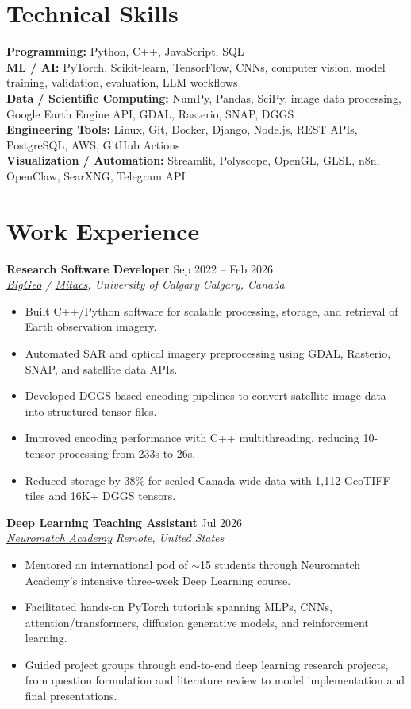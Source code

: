 \documentclass[a4paper,10pt]{article}
\newcommand{\resumeSubheading}[4]{
    \textbf{#1} \hfill #2 \\
    \textit{#3} \hfill \textit{#4}
}
\begin{document}
\section*{Technical Skills}

\textbf{Programming:} Python, C++, JavaScript, SQL \\
\textbf{ML / AI:} PyTorch, Scikit-learn, TensorFlow, CNNs, computer vision, model training, validation, evaluation, LLM workflows \\
\textbf{Data / Scientific Computing:} NumPy, Pandas, SciPy, image data processing, Google Earth Engine API, GDAL, Rasterio, SNAP, DGGS \\
\textbf{Engineering Tools:} Linux, Git, Docker, Django, Node.js, REST APIs, PostgreSQL, AWS, GitHub Actions \\
\textbf{Visualization / Automation:} Streamlit, Polyscope, OpenGL, GLSL, n8n, OpenClaw, SearXNG, Telegram API


\section*{Work Experience}

\resumeSubheading
{Research Software Developer}
{Sep 2022 -- Feb 2026}
{\href{https://biggeo.com}{BigGeo} / \href{https://www.mitacs.ca/}{Mitacs}, University of Calgary}
{Calgary, Canada}
\begin{itemize}[leftmargin=0.25in]
    \item Built C++/Python software for scalable processing, storage, and retrieval of Earth observation imagery.
    \item Automated SAR and optical imagery preprocessing using GDAL, Rasterio, SNAP, and satellite data APIs.
    \item Developed DGGS-based encoding pipelines to convert satellite image data into structured tensor files.
    \item Improved encoding performance with C++ multithreading, reducing 10-tensor processing from 233s to 26s.
    \item Reduced storage by 38\% for scaled Canada-wide data with 1,112 GeoTIFF tiles and 16K+ DGGS tensors.
\end{itemize}

\resumeSubheading
{Deep Learning Teaching Assistant}
{Jul 2026}
{\href{https://neuromatch.io/}{Neuromatch Academy}}
{Remote, United States}
\begin{itemize}[leftmargin=0.25in]
    \item Mentored an international pod of $\sim$15 students through Neuromatch Academy's intensive three-week Deep Learning course.
    \item Facilitated hands-on PyTorch tutorials spanning MLPs, CNNs, attention/transformers, diffusion generative models, and reinforcement learning.
    \item Guided project groups through end-to-end deep learning research projects, from question formulation and literature review to model implementation and final presentations.
\end{itemize}
\end{document}
